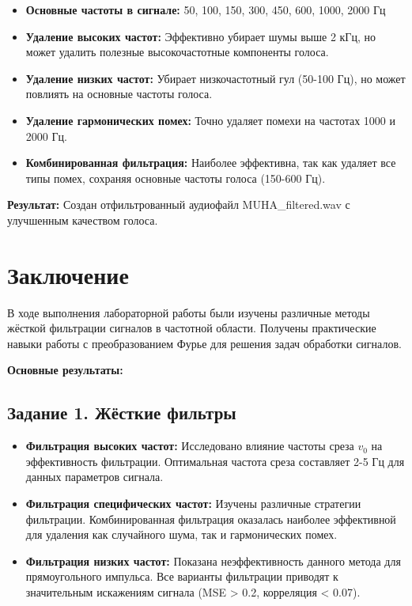 \begin{itemize}
    \item \textbf{Основные частоты в сигнале:} 50, 100, 150, 300, 450, 600, 1000, 2000 Гц
    
    \item \textbf{Удаление высоких частот:} Эффективно убирает шумы выше 2 кГц, но может удалить полезные высокочастотные компоненты голоса.
    
    \item \textbf{Удаление низких частот:} Убирает низкочастотный гул (50-100 Гц), но может повлиять на основные частоты голоса.
    
    \item \textbf{Удаление гармонических помех:} Точно удаляет помехи на частотах 1000 и 2000 Гц.
    
    \item \textbf{Комбинированная фильтрация:} Наиболее эффективна, так как удаляет все типы помех, сохраняя основные частоты голоса (150-600 Гц).
\end{itemize}

\textbf{Результат:} Создан отфильтрованный аудиофайл MUHA\_filtered.wav с улучшенным качеством голоса.

\section*{Заключение}

В ходе выполнения лабораторной работы были изучены различные методы жёсткой фильтрации сигналов в частотной области. Получены практические навыки работы с преобразованием Фурье для решения задач обработки сигналов.

\textbf{Основные результаты:}

\subsection*{Задание 1. Жёсткие фильтры}

\begin{itemize}
    \item \textbf{Фильтрация высоких частот:} Исследовано влияние частоты среза $v_0$ на эффективность фильтрации. Оптимальная частота среза составляет 2-5 Гц для данных параметров сигнала.
    
    \item \textbf{Фильтрация специфических частот:} Изучены различные стратегии фильтрации. Комбинированная фильтрация оказалась наиболее эффективной для удаления как случайного шума, так и гармонических помех.
    
    \item \textbf{Фильтрация низких частот:} Показана неэффективность данного метода для прямоугольного импульса. Все варианты фильтрации приводят к значительным искажениям сигнала (MSE > 0.2, корреляция < 0.07).
\end{itemize}

